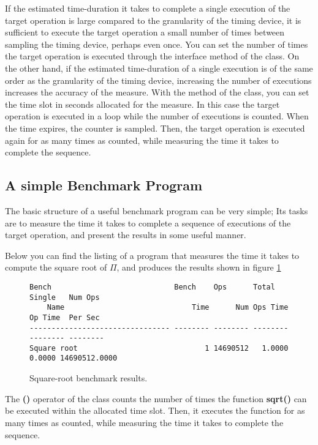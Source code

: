 If the estimated time-duration it takes to complete a single execution
of the target operation is large compared to the granularity of the
timing device, it is sufficient to execute the target operation a
small number of times between sampling the timing device, perhaps even
once. You can set the number of times the target operation is executed
through the  interface method of the
 class. On the other hand, if the estimated
time-duration of a single execution is of the same order as the
granularity of the timing device, increasing the number of executions
increases the accuracy of the measure. With the
 method of the 
class, you can set the time slot in seconds allocated for the
measure. In this case the target operation is executed in a loop while
the number of executions is counted. When the time expires, the
counter is sampled. Then, the target operation is executed again for
as many times as counted, while measuring the time it takes to
complete the sequence.

\subsection*{A simple Benchmark Program}
The basic structure of a useful benchmark program can be very simple; Its
tasks are to measure the time it takes to complete a sequence of
executions of the target operation, and present the results in some useful
manner.

Below you can find the listing of a program that measures the time it takes
to compute the square root of $\Pi$, and produces the results shown in figure 
\ref{sqrtResults}

\begin{figure}[!hbp]
\begin{verbatim}
Bench                            Bench    Ops      Total    Single   Num Ops
    Name                             Time      Num Ops Time  Op Time  Per Sec
-------------------------------- -------- -------- -------- -------- --------
Square root                             1 14690512   1.0000   0.0000 14690512.0000
\end{verbatim}
\caption{Square-root benchmark results.}\label{sqrtResults}
\end{figure}

The \textbf{()} operator of the  class counts the number
of times the function \textbf{sqrt()} can be executed within the allocated time
slot. Then, it executes the  function for as many times as
counted, while measuring the time it takes to complete the sequence.

